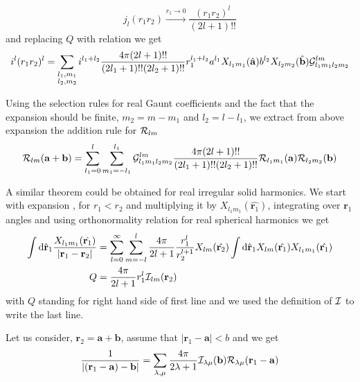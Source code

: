\begin{equation}
j_l(r_1r_2)\xrightarrow{r_1\rightarrow 0}\frac{(r_1r_2)^l}{(2l+1)!!}
\end{equation}
and replacing $Q$ with relation  we get
\begin{equation}
i^l(r_1r_2)^l=\sum_{\begin{subarray}{l}l_1,m_1\\
l_2,m_2
\end{subarray}}i^{l_1+l_2}\frac{4\pi(2l+1)!!}{(2l_1+1)!!(2l_2+1)!!}
r_1^{l_1+l_2}a^{l_1}X_{l_1m_1}(\hat{{\bf a}})b^{l_2}X_{l_2m_2}(\hat{{\bf b}})\mathcal{G}_{l_1m_1l_2m_2}^{lm}
\end{equation}
\par{Using the selection rules for real Gaunt coefficients and the fact that the
expansion should be finite, $m_2=m-m_1$ and $l_2=l-l_1$, we extract from above
expansion the addition rule for $\mathcal{R}_{lm}$}
\begin{equation}
\label{radd}
\mathcal{R}_{lm}({\bf a}+{\bf b})=\sum_{l_1=0}^{l}\sum_{m_1=-l_1}^{l_1}\mathcal{G}_{l_1m_1l_2m_2}^{lm}\frac{4\pi(2l+1)!!}{(2l_1+1)!!(2l_2+1)!!}\mathcal{R}_{l_1m_1}({\bf a})\mathcal{R}_{l_2m_2}({\bf b})
\end{equation}
\par{ A similar theorem could be obtained for real irregular solid
  harmonics. We start with expansion , for $r_1<r_2$ and
  multiplying it by $X_{l_1m_1}(\hat{\bm{r}_1})$, integrating over $\bm{r}_1$
  angles and using orthonormality relation for real spherical harmonics we
  get} 
\begin{equation}
\label{q4}
\begin{split}
\int \text{d} \hat{{\bf r}}_1\frac{X_{l_1m_1}(\hat{{\bf r}_1})}{|{\bf r}_1-{\bf
    r}_2|}&=\sum_{l=0}^{\infty}\sum_{m=-l}^{l}\frac{4\pi}{2l+1}\frac{r_1^l}{r_2^{l+1}}X_{lm}(\hat{{\bf r}_2}) \int \text{d} \hat{{\bf r}}_1 X_{lm}(\hat{{\bf r}_1})X_{l_1m_1}(\hat{{\bf r}_1})\\
Q&=\frac{4\pi}{2l+1}r_1^l\mathcal{I}_{lm}({\bf r}_2)
\end{split}
\end{equation}
with $Q$ standing for right hand side of first line and we used the definition
of $\mathcal{I}$ to write the last line.
\par{Let us consider, $\bm{r}_2=\bm{a}+\bm{b}$, assume that
  $|\bm{r}_1-\bm{a}|<b$ and we get}
\begin{equation}
\frac{1}{|({\bf r}_1-{\bf
    a})-{\bf b}|}=\sum_{\lambda,\mu}\frac{4\pi}{2\lambda+1}\mathcal{I}_{\lambda \mu}({\bf b})\mathcal{R}_{\lambda \mu}({\bf r}_1-{\bf a})
\end{equation}
